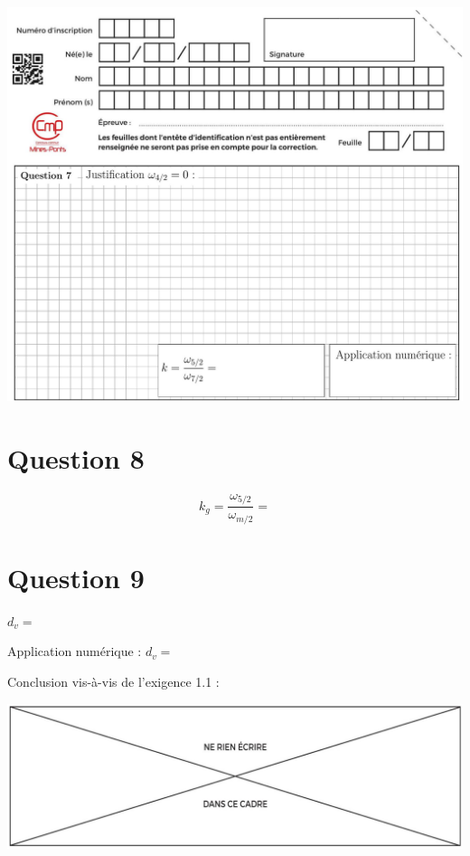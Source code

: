 \documentclass[10pt]{article}
\begin{document}
\begin{center}
\includegraphics[max width=\textwidth]{2024_04_26_3285cfc264024262add0g-24}
\end{center}

\section*{Question 8}
$$
k_{g}=\frac{\omega_{5 / 2}}{\omega_{m / 2}}=
$$

\section*{Question 9}
$d_{v}=$

Application numérique : $d_{v}=$

Conclusion vis-à-vis de l'exigence 1.1 :

\begin{center}
\includegraphics[max width=\textwidth]{2024_04_26_3285cfc264024262add0g-25}
\end{center}
\end{document}
